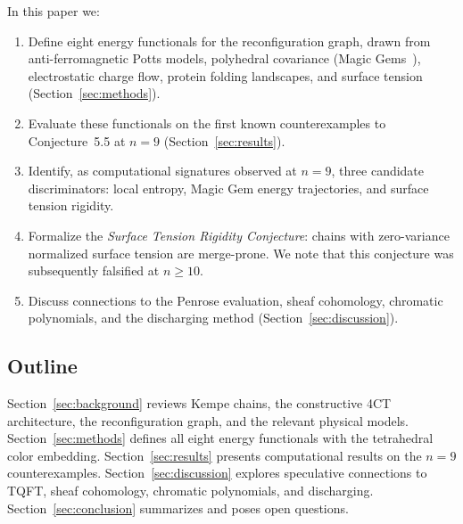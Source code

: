 In this paper we:
\begin{enumerate}[label=(\roman*)]
  \item Define eight energy functionals for the reconfiguration graph,
    drawn from anti-ferromagnetic Potts models, polyhedral covariance
    (Magic Gems~\cite{mathewson2025}), electrostatic charge flow,
    protein folding landscapes, and surface tension
    (Section~\ref{sec:methods}).
  \item Evaluate these functionals on the first known counterexamples to
    Conjecture~5.5 at $n = 9$ (Section~\ref{sec:results}).
  \item Identify, as computational signatures observed at $n = 9$, three
    candidate discriminators: local entropy, Magic Gem energy
    trajectories, and surface tension rigidity.
  \item Formalize the \emph{Surface Tension Rigidity Conjecture}: chains
    with zero-variance normalized surface tension are merge-prone.
    We note that this conjecture was subsequently falsified at
    $n \geq 10$.
  \item Discuss connections to the Penrose evaluation, sheaf cohomology,
    chromatic polynomials, and the discharging method
    (Section~\ref{sec:discussion}).
\end{enumerate}

\subsection{Outline}

Section~\ref{sec:background} reviews Kempe chains, the constructive 4CT
architecture, the reconfiguration graph, and the relevant physical
models. Section~\ref{sec:methods} defines all eight energy functionals
with the tetrahedral color embedding. Section~\ref{sec:results} presents
computational results on the $n = 9$ counterexamples.
Section~\ref{sec:discussion} explores speculative connections to TQFT,
sheaf cohomology, chromatic polynomials, and discharging.
Section~\ref{sec:conclusion} summarizes and poses open questions.
